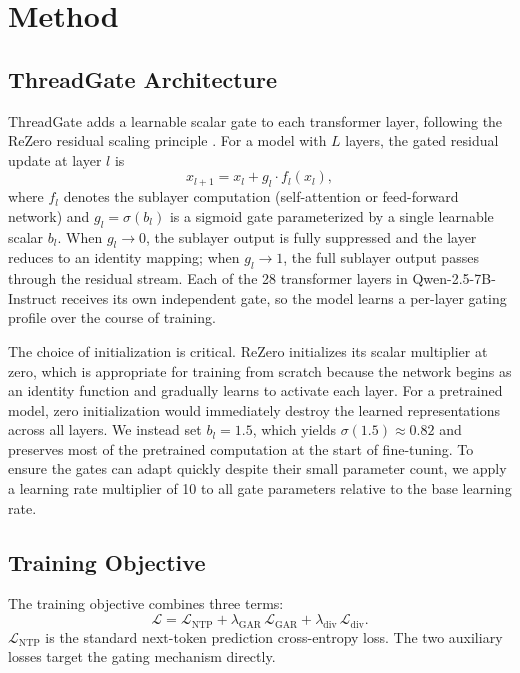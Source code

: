 \section{Method}\label{sec:method}

\subsection{ThreadGate Architecture}

ThreadGate adds a learnable scalar gate to each transformer layer, following the ReZero residual scaling principle \citep{bachlechner2021rezero}. For a model with $L$ layers, the gated residual update at layer $l$ is
\begin{equation}
  x_{l+1} = x_l + g_l \cdot f_l(x_l),
\end{equation}
where $f_l$ denotes the sublayer computation (self-attention or feed-forward network) and $g_l = \sigma(b_l)$ is a sigmoid gate parameterized by a single learnable scalar $b_l$. When $g_l \to 0$, the sublayer output is fully suppressed and the layer reduces to an identity mapping; when $g_l \to 1$, the full sublayer output passes through the residual stream. Each of the 28 transformer layers in Qwen-2.5-7B-Instruct receives its own independent gate, so the model learns a per-layer gating profile over the course of training.

The choice of initialization is critical. ReZero initializes its scalar multiplier at zero, which is appropriate for training from scratch because the network begins as an identity function and gradually learns to activate each layer. For a pretrained model, zero initialization would immediately destroy the learned representations across all layers. We instead set $b_l = 1.5$, which yields $\sigma(1.5) \approx 0.82$ and preserves most of the pretrained computation at the start of fine-tuning. To ensure the gates can adapt quickly despite their small parameter count, we apply a learning rate multiplier of 10 to all gate parameters relative to the base learning rate.

\subsection{Training Objective}\label{sec:loss}

The training objective combines three terms:
\begin{equation}
  \mathcal{L} = \mathcal{L}_\text{NTP} + \lambda_\text{GAR}\,\mathcal{L}_\text{GAR} + \lambda_\text{div}\,\mathcal{L}_\text{div}.
\end{equation}
$\mathcal{L}_\text{NTP}$ is the standard next-token prediction cross-entropy loss. The two auxiliary losses target the gating mechanism directly.

